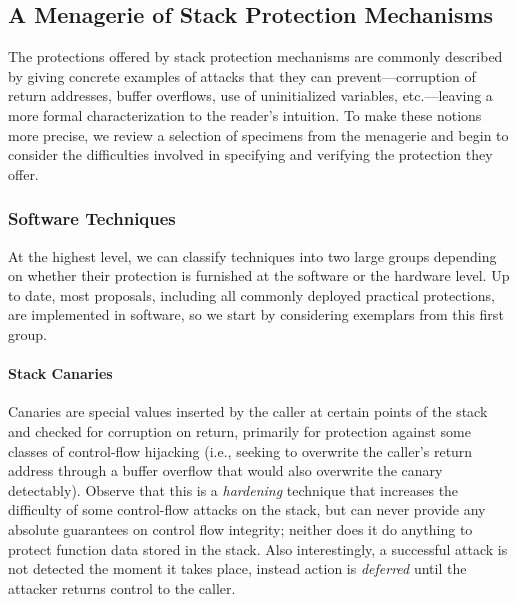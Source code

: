 \subsection{A Menagerie of Stack Protection Mechanisms}


The protections offered by stack protection mechanisms are commonly described by giving
concrete examples of attacks that they can prevent---corruption of return
addresses, buffer overflows, use of uninitialized variables, etc.---leaving
a more formal characterization to the reader's intuition.
%
To make these notions more precise, we review a selection of specimens from the
menagerie and begin to consider the difficulties involved in specifying and
verifying the protection they offer.

\subsubsection{Software Techniques}

At the highest level, we can classify techniques into two large groups depending
on whether their protection is furnished at the software or the hardware level.
Up to date, most proposals, including all commonly deployed practical
protections, are implemented in software, so we start by considering exemplars
from this first group.

\paragraph{Stack Canaries}
%
Canaries are special values inserted by the caller at certain points of the
stack and checked for corruption on return, primarily for protection against
some classes of control-flow hijacking (i.e., seeking to overwrite the caller's
return address through a buffer overflow that would also overwrite the canary
detectably).
%
Observe that this is a \emph{hardening} technique that increases the difficulty
of some control-flow attacks on the stack, but can never provide any absolute
guarantees on control flow integrity; neither does it do anything to protect
function data stored in the stack.
%
Also interestingly, a successful attack is not detected the moment it takes
place, instead action is \emph{deferred} until the attacker returns control to
the caller.

